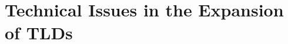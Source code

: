 \documentclass[11pt, a4paper]{article}
\begin{document}








\section{Technical Issues in the Expansion of TLDs}


\nocite{Manning2011Challenges}
\nocite{rfc3226}
\nocite{root2013iana}
\nocite{berneke2013gtlds}
\nocite{kaufman2013unicode}
\nocite{leiba2009good}

\newpage


\end{document}
